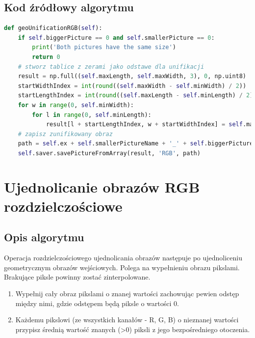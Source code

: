 \documentclass[a4paper,12pt, titlepage]{report}
\begin{document}
\subsection*{Kod źródłowy algorytmu}
\begin{lstlisting}[language=Python]
def geoUnificationRGB(self):
    if self.biggerPicture == 0 and self.smallerPicture == 0:
        print('Both pictures have the same size')
        return 0
    # stworz tablice z zerami jako odstawe dla unifikacji
    result = np.full((self.maxLength, self.maxWidth, 3), 0, np.uint8)
    startWidthIndex = int(round((self.maxWidth - self.minWidth) / 2))
    startLengthIndex = int(round((self.maxLength - self.minLength) / 2))
    for w in range(0, self.minWidth):
        for l in range(0, self.minLength):
            result[l + startLengthIndex, w + startWidthIndex] = self.matrix[w, l]
    # zapisz zunifikowany obraz
    path = self.ex + self.smallerPictureName + '_' + self.biggerPictureName + '.png'
    self.saver.savePictureFromArray(result, 'RGB', path)
\end{lstlisting}

\section{Ujednolicanie obrazów RGB rozdzielczościowe}
\subsection*{Opis algorytmu}
\par Operacja rozdzielczościowego ujednolicania obrazów następuje po ujednoliceniu geometrycznym obrazów wejściowych. Polega na wypełnieniu obrazu pikslami. Brakujące piksle powinny zostać zinterpolowane.
\begin{enumerate}
\item Wypełnij cały obraz pikslami o znanej wartości zachowując pewien odstęp między nimi, gdzie odstępem będą piksle o wartości 0.
\item Każdemu pikslowi (ze wszystkich kanałów - R, G, B) o nieznanej wartości przypisz średnią wartość znanych (>0) piksli z jego bezpośredniego otoczenia.
\end{enumerate}
\end{document}
